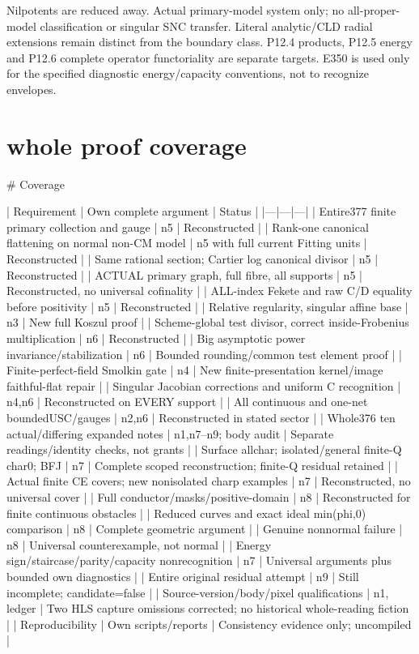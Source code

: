 \documentclass[11pt]{article}
\begin{document}
\begin{OwnProofBody}
Nilpotents are reduced away. Actual primary-model system only; no all-proper-model classification or singular SNC transfer. Literal analytic/CLD radial extensions remain distinct from the boundary class. P12.4 products, P12.5 energy and P12.6 complete operator functoriality are separate targets. E350 is used only for the specified diagnostic energy/capacity conventions, not to recognize envelopes.

\end{OwnProofBody}

\section{whole proof coverage}
\begin{OwnProofBody}
# Coverage

| Requirement | Own complete argument | Status |
|---|---|---|
| Entire377 finite primary collection and gauge | n5 | Reconstructed |
| Rank-one canonical flattening on normal non-CM model | n5 with full current Fitting units | Reconstructed |
| Same rational section; Cartier log canonical divisor | n5 | Reconstructed |
| ACTUAL primary graph, full fibre, all supports | n5 | Reconstructed, no universal cofinality |
| ALL-index Fekete and raw C/D equality before positivity | n5 | Reconstructed |
| Relative regularity, singular affine base | n3 | New full Koszul proof |
| Scheme-global test divisor, correct inside-Frobenius multiplication | n6 | Reconstructed |
| Big asymptotic power invariance/stabilization | n6 | Bounded rounding/common test element proof |
| Finite-perfect-field Smolkin gate | n4 | New finite-presentation kernel/image faithful-flat repair |
| Singular Jacobian corrections and uniform C recognition | n4,n6 | Reconstructed on EVERY support |
| All continuous and one-net boundedUSC/gauges | n2,n6 | Reconstructed in stated sector |
| Whole376 ten actual/differing expanded notes | n1,n7--n9; body audit | Separate readings/identity checks, not grants |
| Surface allchar; isolated/general finite-Q char0; BFJ | n7 | Complete scoped reconstruction; finite-Q residual retained |
| Actual finite CE covers; new nonisolated charp examples | n7 | Reconstructed, no universal cover |
| Full conductor/masks/positive-domain | n8 | Reconstructed for finite continuous obstacles |
| Reduced curves and exact ideal min(phi,0) comparison | n8 | Complete geometric argument |
| Genuine nonnormal failure | n8 | Universal counterexample, not normal |
| Energy sign/staircase/parity/capacity nonrecognition | n7 | Universal arguments plus bounded own diagnostics |
| Entire original residual attempt | n9 | Still incomplete; candidate=false |
| Source-version/body/pixel qualifications | n1, ledger | Two HLS capture omissions corrected; no historical whole-reading fiction |
| Reproducibility | Own scripts/reports | Consistency evidence only; uncompiled |

\end{OwnProofBody}
\end{document}
